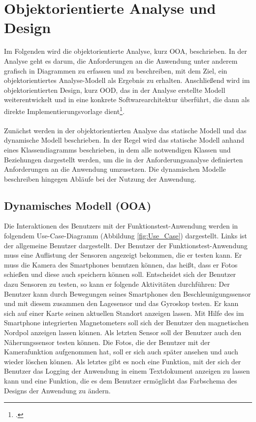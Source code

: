 \chapter{Objektorientierte Analyse und Design}

Im Folgenden wird die objektorientierte Analyse, kurz OOA, beschrieben. In der Analyse geht es darum, die Anforderungen an die Anwendung unter anderem grafisch in Diagrammen zu erfassen und zu beschreiben, mit dem Ziel, ein objektorientiertes Analyse-Modell als Ergebnis zu erhalten. Anschließend wird im objektorientierten Design, kurz OOD, das in der Analyse erstellte Modell weiterentwickelt und in eine konkrete Softwarearchitektur überführt, die dann als direkte Implementierungsvorlage dient\footcite{SWTBalzert}.
\\
\\
Zunächst werden in der objektorientierten Analyse das statische Modell und das dynamische Modell beschrieben. In der Regel wird das statische Modell anhand eines Klassendiagramms beschrieben, in dem alle notwendigen Klassen und Beziehungen dargestellt werden, um die in der Anforderungsanalyse definierten Anforderungen an die Anwendung umzusetzen. Die dynamischen Modelle beschreiben hingegen Abläufe bei der Nutzung der Anwendung. 

\section{Dynamisches Modell (OOA)}

Die Interaktionen des Benutzers mit der Funktionstest-Anwendung werden in folgendem Use-Case-Diagramm (Abbildung \ref{fig:Use_Case}) dargestellt. Links ist der allgemeine Benutzer dargestellt. Der Benutzer der Funktionstest-Anwendung muss eine Auflistung der Sensoren angezeigt bekommen, die er testen kann. Er muss die Kamera des Smartphones benutzen können, das heißt, dass er Fotos schießen und diese auch speichern können soll. Entscheidet sich der Benutzer dazu Sensoren zu testen, so kann er folgende Aktivitäten durchführen: Der Benutzer kann durch Bewegungen seines Smartphones den Beschleunigungssensor und mit diesem zusammen den Lagesensor und das Gyroskop testen. Er kann sich auf einer Karte seinen aktuellen Standort anzeigen lassen. Mit Hilfe des im Smartphone integrierten Magnetometers soll sich der Benutzer den magnetischen Nordpol anzeigen lassen können. Als letzten Sensor soll der Benutzer auch den Näherungssensor testen können. Die Fotos, die der Benutzer mit der Kamerafunktion aufgenommen hat, soll er sich auch später ansehen und auch wieder löschen können. Als letztes gibt es noch eine Funktion, mit der sich der Benutzer das Logging der Anwendung in einem Textdokument anzeigen zu lassen kann und eine Funktion, die es dem Benutzer ermöglicht das Farbschema des Designs der Anwendung zu ändern.  

